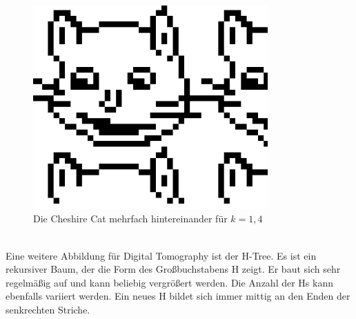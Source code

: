 \documentclass[a4,abstract=on]{scrartcl}
\begin{document}
\begin{figure}[H]
\centering
\includegraphics[width=9cm]{cats.png}
\caption{Die Cheshire Cat mehrfach hintereinander für $k=1,4$}
\label{fig:cats}
\end{figure}
\ \\
Eine weitere Abbildung für Digital Tomography ist der H-Tree. Es ist ein rekursiver Baum, der die Form des Großbuchstabens H zeigt. Er baut sich sehr regelmäßig auf und kann beliebig vergrößert werden. Die Anzahl der Hs kann ebenfalls variiert werden. Ein neues H bildet sich immer mittig an den Enden der senkrechten Striche.
\end{document}
